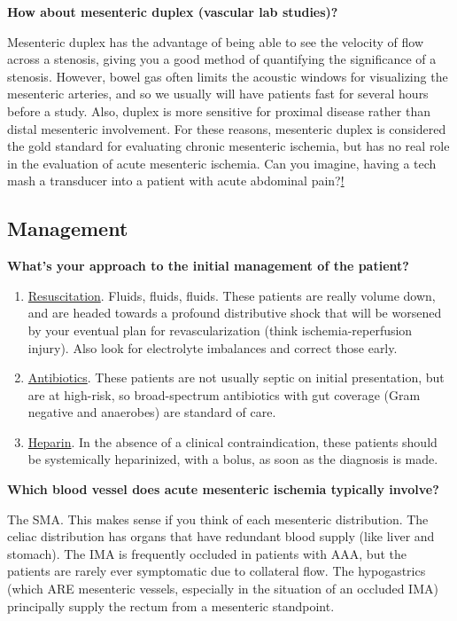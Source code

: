\documentclass[
]{book}
\begin{document}
\textbf{How about mesenteric duplex (vascular lab studies)?}

Mesenteric duplex has the advantage of being able to see the velocity of
flow across a stenosis, giving you a good method of quantifying the
significance of a stenosis. However, bowel gas often limits the acoustic
windows for visualizing the mesenteric arteries, and so we usually will
have patients fast for several hours before a study. Also, duplex is
more sensitive for proximal disease rather than distal mesenteric
involvement. For these reasons, mesenteric duplex is considered the gold
standard for evaluating chronic mesenteric ischemia, but has no real
role in the evaluation of acute mesenteric ischemia. Can you imagine,
having a tech mash a transducer into a patient with acute abdominal
pain?\underline{!}~

\hypertarget{management-4}{%
\subsection{Management}\label{management-4}}

\textbf{What's your approach to the initial management of the patient?}

\begin{enumerate}
\def\labelenumi{\arabic{enumi}.}
\item
  \underline{Resuscitation}. Fluids, fluids, fluids. These patients are
  really volume down, and are headed towards a profound distributive
  shock that will be worsened by your eventual plan for
  revascularization (think ischemia-reperfusion injury). Also look for
  electrolyte imbalances and correct those early.
\item
  \underline{Antibiotics}. These patients are not usually septic on initial
  presentation, but are at high-risk, so broad-spectrum antibiotics
  with gut coverage (Gram negative and anaerobes) are standard of
  care.
\item
  \underline{Heparin}. In the absence of a clinical contraindication, these
  patients should be systemically heparinized, with a bolus, as soon
  as the diagnosis is made.~
\end{enumerate}

\textbf{Which blood vessel does acute mesenteric ischemia typically involve?}

The SMA. This makes sense if you think of each mesenteric distribution.
The celiac distribution has organs that have redundant blood supply
(like liver and stomach). The IMA is frequently occluded in patients
with AAA, but the patients are rarely ever symptomatic due to collateral
flow. The hypogastrics (which ARE mesenteric vessels, especially in the
situation of an occluded IMA) principally supply the rectum from a
mesenteric standpoint.
\end{document}
